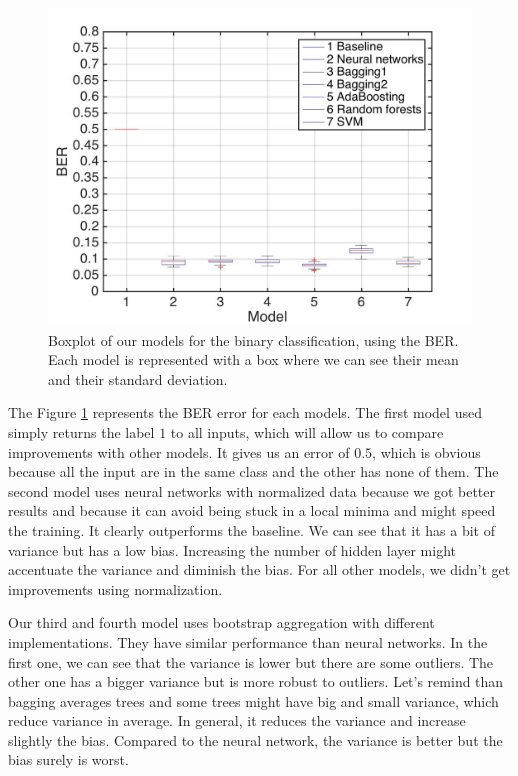 \documentclass{article} %
\begin{document}
\begin{figure}
\center
\includegraphics[width=5in]{figures/binaryclassifications.jpg} 
\caption{Boxplot of our models for the binary classification, using the BER. Each model is represented with a box where we can see their mean and their standard deviation.}
\label{fig:bin_models}
\end{figure}

The Figure \ref{fig:bin_models} represents the BER error for each models. The first model used simply returns the label $1$ to all inputs, which will allow us to compare improvements with other models. It gives us an error of $0.5$, which is obvious because all the input are in the same class and the other has none of them. The second model uses neural networks with normalized data because we got better results and because it can avoid being stuck in a local minima and might speed the training. It clearly outperforms the baseline. We can see that it has a bit of variance but has a low bias. Increasing the number of hidden layer might accentuate the variance and diminish the bias. For all other models, we didn't get improvements using normalization.

Our third and fourth model uses bootstrap aggregation with different implementations. They have similar performance than neural networks. In the first one, we can see that the variance is lower but there are some outliers. The other one has a bigger variance but is more robust to outliers. Let's remind than bagging averages trees and some trees might have big and small variance, which reduce variance in average. In general, it reduces the variance and increase slightly the bias. Compared to the neural network, the variance is better but the bias surely is worst.
\end{document}
